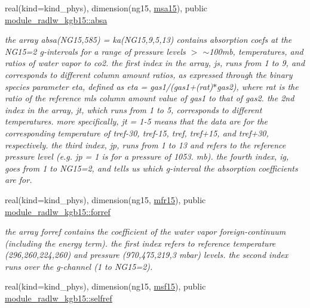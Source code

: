 \begin{DoxyCompactItemize}
real(kind=kind\+\_\+phys), dimension(ng15, \hyperlink{namespacemodule__radlw__kgb15_abb9e98034166a07a6e349631d7fbb2a3}{msa15}), public \hyperlink{group__module__radlw__kgbnn_gaa6412ac501e2afed3d1b64b0cdcdab9e}{module\+\_\+radlw\+\_\+kgb15\+::absa}
\begin{DoxyCompactList}\small\item\em the array absa(\+N\+G15,585) = ka(\+N\+G15,9,5,13) contains absorption coefs at the N\+G15=2 g-\/intervals for a range of pressure levels $>$ $\sim$100mb, temperatures, and ratios of water vapor to co2. the first index in the array, js, runs from 1 to 9, and corresponds to different column amount ratios, as expressed through the binary species parameter eta, defined as eta = gas1/(gas1+(rat)$\ast$gas2), where rat is the ratio of the reference mls column amount value of gas1 to that of gas2. the 2nd index in the array, jt, which runs from 1 to 5, corresponds to different temperatures. more specifically, jt = 1-\/5 means that the data are for the corresponding temperature of tref-\/30, tref-\/15, tref, tref+15, and tref+30, respectively. the third index, jp, runs from 1 to 13 and refers to the reference pressure level (e.\+g. jp = 1 is for a pressure of 1053. mb). the fourth index, ig, goes from 1 to N\+G15=2, and tells us which g-\/interval the absorption coefficients are for. \end{DoxyCompactList}\item 
\mbox{\label{group__module__radlw__kgbnn_gada70146d20f89f059141aa4cf58a0894}} 
real(kind=kind\+\_\+phys), dimension(ng15, \hyperlink{group__module__radlw__kgbnn_gad4d78009d0c7ffa27dbb228e68307675}{mfr15}), public \hyperlink{group__module__radlw__kgbnn_gada70146d20f89f059141aa4cf58a0894}{module\+\_\+radlw\+\_\+kgb15\+::forref}
\begin{DoxyCompactList}\small\item\em the array forref contains the coefficient of the water vapor foreign-\/continuum (including the energy term). the first index refers to reference temperature (296,260,224,260) and pressure (970,475,219,3 mbar) levels. the second index runs over the g-\/channel (1 to N\+G15=2). \end{DoxyCompactList}\item 
\mbox{\label{group__module__radlw__kgbnn_ga1d14e9b2e607f2022d84c6fc0cd27c4e}} 
real(kind=kind\+\_\+phys), dimension(ng15, \hyperlink{group__module__radlw__kgbnn_gae1b588ee60974c2d451c89f842601e07}{msf15}), public \hyperlink{group__module__radlw__kgbnn_ga1d14e9b2e607f2022d84c6fc0cd27c4e}{module\+\_\+radlw\+\_\+kgb15\+::selfref}

\end{DoxyCompactItemize}
